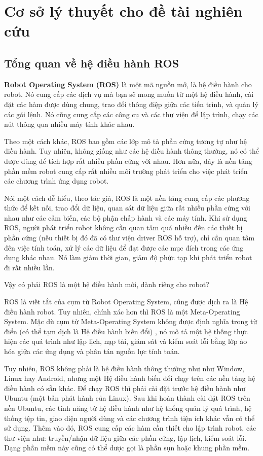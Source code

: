 \chapter{Cơ sở lý thuyết cho đề tài nghiên cứu}

\section{Tổng quan về hệ điều hành ROS}
\textbf{Robot Operating System (ROS)} là một mã nguồn mở, là hệ điều hành cho robot. Nó cung cấp các dịch vụ mà bạn sẽ mong muốn từ một hệ điều hành, cài đặt các hàm được dùng chung, trao đổi thông điệp giữa các tiến trình, và quản lý các gói lệnh. Nó cũng cung cấp các công cụ và các thư viện để lập trình, chạy các nút thông qua nhiều máy tính khác nhau. 

Theo một cách khác, ROS bao gồm các lớp mô tả phần cứng tương tự như hệ điều hành. Tuy nhiên, không giống như các hệ điều hành thông thường, nó có thể được dùng để tích hợp rất nhiều phần cứng với nhau. Hơn nữa, đây là nền tảng phần mềm robot cung cấp rất nhiều môi trường phát triển cho việc phát triển các chương trình ứng dụng robot.

Nói một cách dễ hiểu, theo tác giả, ROS là một nền tảng cung cấp các phương thức để kết nối, trao đổi dữ liệu, quan sát dữ liệu giữa rất nhiều phần cứng với nhau như các cảm biến, các bộ phận chấp hành và các máy tính. Khi sử dụng ROS, người phát triển robot không cần quan tâm quá nhiều đến các thiết bị phần cứng (nếu thiết bị đó đã có thư viện driver ROS hỗ trợ), chỉ cần quan tâm đên việc tính toán, xử lý các dữ liệu để đạt được các mục đích trong các ứng dụng khác nhau. Nó làm giảm thời gian, giảm độ phức tạp khi phát triển robot đi rất nhiều lần. 

Vậy có phải ROS là một hệ điều hành mới, dành riêng cho robot?

ROS là viết tắt của cụm từ Robot Operating System, cũng được dịch ra là Hệ điều hành robot. Tuy nhiên, chính xác hơn thì ROS là một Meta-Operating System. Mặc dù cụm từ Meta-Operating System không được định nghĩa trong từ điển (có thể tạm dịch là Hệ điều hành biến đổi) , nó mô tả một hệ thống thực hiện các quá trình như lập lịch, nạp tải, giám sát và kiểm soát lỗi bằng lớp ảo hóa giữa các ứng dụng và phân tán nguồn lực tính toán.

Tuy nhiên, ROS không phải là hệ điều hành thông thường như như Window, Linux hay Android, nhưng một Hệ điều hành biến đổi chạy trên các nền tảng hệ điều hành có sẵn khác. Để chạy ROS thì phải cài đặt trước hệ điều hành như Ubuntu (một bản phát hành của Linux). Sau khi hoàn thành cài đặt ROS trên nền Ubuntu,  các tính năng từ hệ điều hành như hệ thống quản lý quá trình, hệ thống tệp tin, giao diện người dùng và các chương trình tiện ích khác vẫn có thể sử dụng. Thêm vào đó, ROS cung cấp các hàm cần thiết cho lập trình robot, các thư viện như: truyền/nhận dữ liệu giữa các phần cứng, lập lịch, kiểm soát lỗi. Dạng phần mềm này cũng có thể dược gọi là phần sụn hoặc khung phần mềm.

